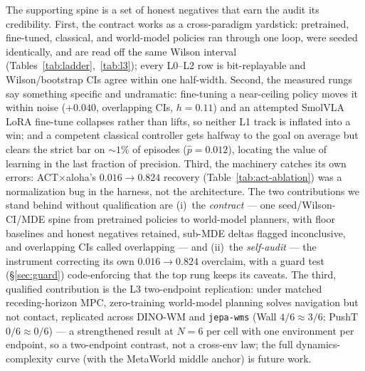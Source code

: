 \documentclass[10pt]{article}
\begin{document}
The supporting spine is a set of honest negatives that earn the audit its
credibility. First, the contract works as a cross-paradigm yardstick:
pretrained, fine-tuned, classical, and world-model policies ran through
one loop, were seeded identically, and are read off the same Wilson
interval (Tables~\ref{tab:ladder},~\ref{tab:l3}); every L0--L2 row is
bit-replayable and Wilson/bootstrap CIs agree within one half-width.
Second, the measured rungs say something specific and undramatic:
fine-tuning a near-ceiling policy moves it within noise ($+0.040$,
overlapping CIs, $h{=}0.11$) and an attempted SmolVLA LoRA fine-tune
collapses rather than lifts, so neither L1 track is inflated into a win;
and a competent classical controller gets halfway to the goal on average
but clears the strict bar on ${\sim}1\%$ of episodes ($\hat{p}{=}0.012$),
locating the value of learning in the last fraction of precision. Third,
the machinery catches its own errors: ACT$\times$aloha's $0.016\to0.824$
recovery (Table~\ref{tab:act-ablation}) was a normalization bug in the
harness, not the architecture. The two contributions we stand behind
without qualification are (i)~the \emph{contract} --- one
seed/Wilson-CI/MDE spine from pretrained policies to world-model planners,
with floor baselines and honest negatives retained, sub-MDE deltas flagged
inconclusive, and overlapping CIs called overlapping --- and (ii)~the
\emph{self-audit} --- the instrument correcting its own $0.016\to0.824$
overclaim, with a guard test (\S\ref{sec:guard}) code-enforcing that the
top rung keeps its caveats. The third, qualified contribution is the L3
two-endpoint replication: under matched receding-horizon MPC, zero-training
world-model planning solves navigation but not contact, replicated across
DINO-WM and \texttt{jepa-wms} (Wall $4/6 \approx 3/6$; PushT $0/6 \approx
0/6$) --- a strengthened result at $N{=}6$ per cell with one environment per
endpoint, so a two-endpoint contrast, not a cross-env law; the full
dynamics-complexity curve (with the MetaWorld middle anchor) is future
work.
\end{document}
